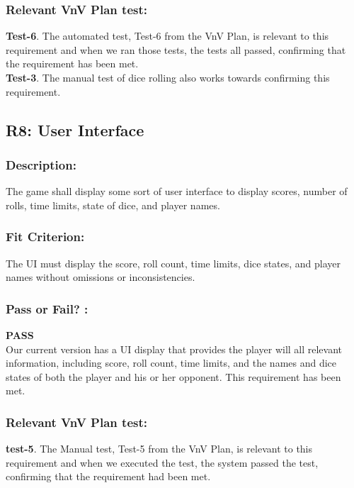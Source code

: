 \documentclass[12pt, titlepage]{article}
\begin{document}
\subsubsection*{Relevant VnV Plan test: } \textbf{Test-6}.  The automated test, Test-6 from the VnV Plan, is relevant to this requirement and when we ran those tests, the tests all passed, confirming that the requirement has been met.\\
\textbf{Test-3}. The manual test of dice rolling also works towards confirming this requirement.


\subsection{R8: User Interface} 
\label{R8} 

\subsubsection*{Description:}  The game shall display some sort of user interface to display scores, number of rolls, time limits, state of dice, and player names.

\subsubsection*{Fit Criterion:} The UI must display the score, roll count, time limits, dice states, and player names without omissions or inconsistencies.

\subsubsection*{Pass or Fail? :} 

 \noindent \textbf{PASS}\\
 
 Our current version has a UI display that provides the player will all relevant information, including score, roll count, time limits, and the names and dice states of both the player and his or her opponent. This requirement has been met.

\subsubsection*{Relevant VnV Plan test: } \textbf{test-5}.  The Manual test, Test-5 from the VnV Plan, is relevant to this requirement and when we executed the test, the system passed the test, confirming that the requirement had been met.
\end{document}
